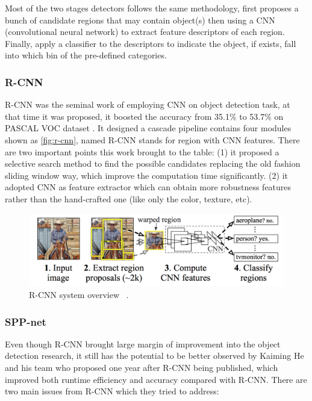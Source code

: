 Most of the two stages detectors follows the same methodology, first proposes a
bunch of candidate regions that may contain object(s) then using a CNN
(convolutional neural network) to extract feature descriptors of each region.
Finally, apply a classifier to the descriptors to indicate the object, if exists,
fall into which bin of the pre-defined categories.

\subsubsection{R-CNN}

R-CNN was the seminal work of employing CNN on object detection task, at that time
it was proposed, it boosted the accuracy from 35.1\% to 53.7\% on PASCAL
VOC dataset \cite{r-cnn-paper-2013}.
It designed a cascade pipeline contains four modules shown as
\autoref{fig:r-cnn}, named R-CNN stands for region with CNN features.
There are two important points this work brought to the table:
(1) it proposed a selective search method to find the possible candidates
replacing the old fashion sliding window way,
which improve the computation time significantly.
(2) it adopted CNN as feature extractor which can obtain more robustness
features rather than the hand-crafted one (like
only the color, texture, etc).

\begin{figure}
    \includegraphics[width=\linewidth]{figures/r_cnn.png}
    \caption{R-CNN system overview ~\protect\cite{r-cnn-paper-2013}.}
    \label{fig:r-cnn}
\end{figure}

\subsubsection{SPP-net}

Even though R-CNN brought large margin of improvement into the object detection
research, it still has the potential to be
better observed by Kaiming He and his team who proposed
\cite{spp-net-paper-2014} one year after R-CNN being published,
which improved both runtime efficiency and accuracy compared with R-CNN. There
are two main issues from R-CNN which
they tried to address:

